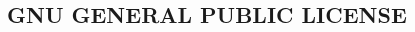\documentclass[class=book, crop=false]{standalone}
\begin{document}
\begin{CJK}{UTF8}{gbsn}

\chapter{GNU GENERAL PUBLIC LICENSE}



\cleardoublepage

\end{CJK}
\end{document}
